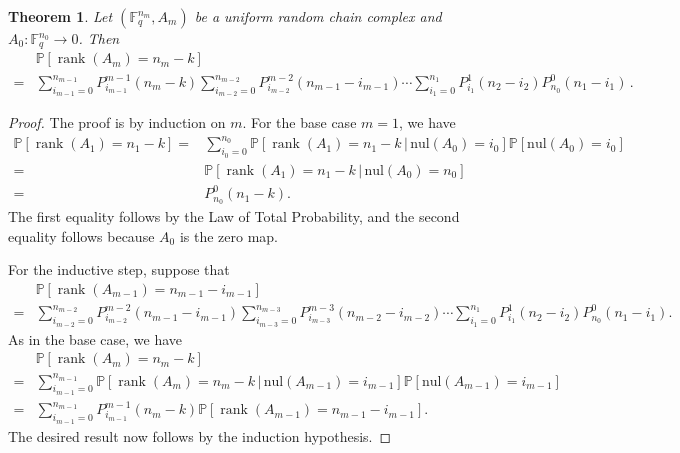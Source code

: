 \documentclass[3p,times]{elsarticle}
\newtheorem{theorem}{Theorem}[section]
\theoremstyle{remark}
\DeclareMathOperator{\rank}{\mathrm{rank}}
\newcommand{\Fq}{\mathbb{F}_q}
\newcommand{\nul}{\mathrm{nul}}
\newcommand{\st}{\,|\,} %
\begin{document}
\begin{theorem}\label{thmProbranks}
Let $(\Fq^{n_m}, A_m)$ be a uniform random chain complex 
and $A_0:\Fq^{n_0}\to 0$.  Then
\begin{align*}
 &  \mathbb{P}\left[\rank(A_{m}) = n_{m} - k\right]\\
=& 	\sum_{i_{m-1}=0}^{n_{m-1}} P_{i_{m-1}}^{m-1}\left(n_{m} -k\right)
	\sum_{i_{m-2}=0}^{n_{m-2}} P_{i_{m-2}}^{m-2}\left(n_{m-1} - i_{m-1}\right)
		\cdots
        \sum_{i_1 = 0}^{n_1} P_{i_1}^1\left(n_2 - i_2\right) P_{n_0}^0 \left(n_1 - i_1\right) \, .
\end{align*}
\end{theorem}
\begin{proof}
The proof is by induction on $m$. For the base case $m=1$, we have
\begin{align*}
\mathbb{P}\left[\rank(A_1) = n_1 - k\right]
	=& \sum_{i_0=0}^{n_0}\mathbb{P}\left [\rank(A_1)= n_1 - k\st\nul (A_0) = i_0\right]
		\mathbb{P}\left[\nul(A_0) = i_0 \right]\\
	=& \mathbb{P}\left [\rank(A_1)= n_1 - k\st\nul (A_0) = n_0\right]\\
	=& P_{n_0}^0(n_1 - k).
\end{align*}
The first equality follows by the Law of Total Probability, and the second equality follows because $A_0$ is the zero map.

For the inductive step, suppose that
\begin{align*}
 &  \mathbb{P}\left[\rank(A_{m-1}) = n_{m-1} - i_{m-1}\right]\\
=& 	\sum_{i_{m-2}=0}^{n_{m-2}} P_{i_{m-2}}^{m-2}\left(n_{m-1} -i_{m-1}\right)
	\sum_{i_{m-3}=0}^{n_{m-3}} P_{i_{m-3}}^{m-3}\left(n_{m-2} - i_{m-2}\right)
		\cdots
	\sum_{i_1 = 0}^{n_1} P_{i_1}^1\left(n_2 - i_2\right) P_{n_0}^0 \left(n_1 - i_1\right).
\end{align*}
As in the base case, we have 
\begin{align*}
   & \mathbb{P}\left[\rank(A_{m}) = n_{m} - k\right]\\
  =& \sum_{i_{m-1}=0}^{n_{m-1}} \mathbb{P}\left[ \rank(A_{m}) = n_{m} - k  
  		\st \nul(A_{m-1}) = i_{m-1}\right] \mathbb{P}\left[\nul(A_{m-1}) = i_{m-1}\right]\\
  =& \sum_{i_{m-1}=0}^{n_{m-1}} P_{i_{m-1}}^{m-1}(n_{m} - k)
  		\mathbb{P}\left[\rank(A_{m-1}) = n_{m-1}- i_{m-1}\right].
\end{align*}
The desired result now follows by the induction hypothesis.
\end{proof}
\end{document}
